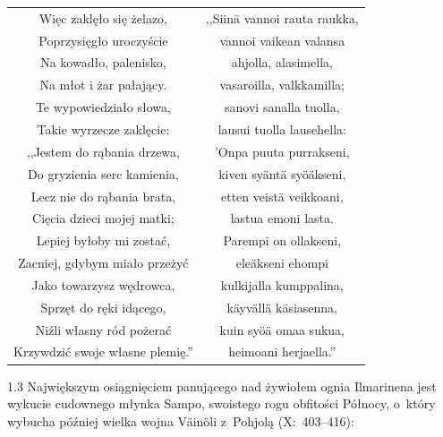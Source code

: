 \documentclass[11pt,a4paper,twoside]{report}
\begin{document}
{\centering
\small
\begin{longtable}{c c}
Więc zaklęło się żelazo, & ,,Siinä vannoi rauta raukka, \\
Poprzysięgło uroczyście & vannoi vaikean valansa \\
Na kowadło, palenisko, & ahjolla, alasimella, \\
Na młot i żar pałający. & vasaroilla, valkkamilla; \\
Te wypowiedziało słowa, & sanovi sanalla tuolla, \\
Takie wyrzecze zaklęcie: & lausui tuolla lausehella: \\
,,Jestem do rąbania drzewa, & 'Onpa puuta purrakseni, \\
Do gryzienia serc kamienia, & kiven syäntä syöäkseni, \\
Lecz nie do rąbania brata, & etten veistä veikkoani, \\
Cięcia dzieci mojej matki; & lastua emoni lasta. \\
Lepiej byłoby mi zostać, & Parempi on ollakseni, \\
Zacniej, gdybym miało przeżyć & eleäkseni ehompi \\ \newpage
Jako towarzysz wędrowca, & kulkijalla kumppalina, \\
Sprzęt do ręki idącego, & käyvällä käsiasenna, \\
Niźli własny ród pożerać & kuin syöä omaa sukua, \\
Krzywdzić swoje własne plemię.'' & heimoani herjaella.'' \\
\end{longtable}
}
\vspace*{1.5\baselineskip}
\begin{spacing}{1.3}
Największym osiągnięciem panującego nad żywiołem ognia Ilmarinena jest wykucie cudownego młynka Sampo, swoistego rogu obfitości Północy, o~który wybucha później wielka wojna Väinöli z~Pohjolą (X:~403--416):
\end{spacing}
\end{document}
